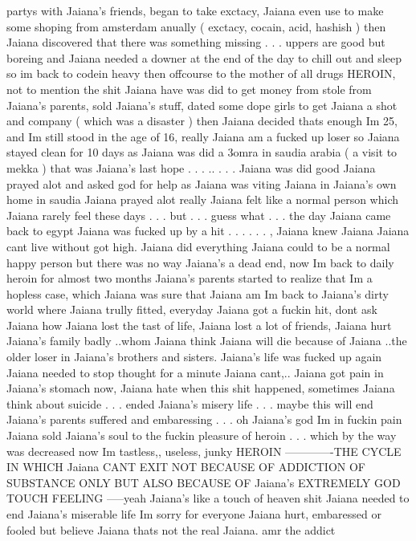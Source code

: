 \documentclass[12pt]{book}
\begin{document}
partys with Jaiana's friends, began to take exctacy, Jaiana even use to make some shoping from amsterdam anually ( exctacy, cocain, acid, hashish ) then Jaiana discovered that there was something missing . . .  uppers are good but boreing and Jaiana needed a downer at the end of the day to chill out and sleep so im back to codein heavy then offcourse to the mother of all drugs HEROIN, not to mention the shit Jaiana have was did to get money from stole from Jaiana's parents, sold Jaiana's stuff, dated some dope girls to get Jaiana a shot and company ( which was a disaster ) then Jaiana decided thats enough Im 25, and Im still stood in the age of 16, really Jaiana am a fucked up loser so Jaiana stayed clean for 10 days as Jaiana was did a 3omra in saudia arabia ( a visit to mekka ) that was Jaiana's last hope . . . ..  . . .  Jaiana was did good Jaiana prayed alot and asked god for help as Jaiana was viting Jaiana in Jaiana's own home in saudia Jaiana prayed alot really Jaiana felt like a normal person which Jaiana rarely feel these days . . .  but . . .  guess what . . .  the day Jaiana came back to egypt Jaiana was fucked up by a hit . . .   . . .  , Jaiana knew Jaiana Jaiana cant live without got high. Jaiana did everything Jaiana could to be a normal happy person but there was no way Jaiana's a dead end, now Im back to daily heroin for almost two months Jaiana's parents started to realize that Im a hopless case, which Jaiana was sure that Jaiana am Im back to Jaiana's dirty world where Jaiana trully fitted, everyday Jaiana got a fuckin hit, dont ask Jaiana how Jaiana lost the tast of life, Jaiana lost a lot of friends, Jaiana hurt Jaiana's family badly ..whom Jaiana think Jaiana will die because of Jaiana ..the older loser in Jaiana's brothers and sisters. Jaiana's life was fucked up again Jaiana needed to stop thought for a minute Jaiana cant,.. Jaiana got pain in Jaiana's stomach now, Jaiana hate when this shit happened, sometimes Jaiana think about suicide  . . .  ended Jaiana's misery life . . .  maybe this will end Jaiana's parents suffered and embaressing  . . .  oh Jaiana's god Im in fuckin pain Jaiana sold Jaiana's soul to the fuckin pleasure of heroin . . .  which by the way was decreased now Im tastless,, useless, junky HEROIN -------------THE CYCLE IN WHICH Jaiana CANT EXIT NOT BECAUSE OF ADDICTION OF SUBSTANCE ONLY BUT ALSO BECAUSE OF Jaiana's EXTREMELY GOD TOUCH FEELING -----yeah Jaiana's like a touch of heaven shit Jaiana needed to end Jaiana's miserable life Im sorry for everyone Jaiana hurt, embaressed or fooled but believe Jaiana thats not the real Jaiana. amr the addict
\end{document}
